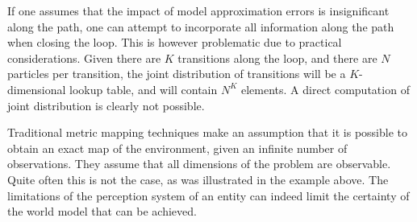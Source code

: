 If one assumes that the impact of model approximation errors is
insignificant along the path, one can attempt to incorporate all
information along the path when closing the loop. This is however
problematic due to practical considerations. Given there are $K$
transitions along the loop, and there are $N$ particles per
transition, the joint distribution of transitions will be a
$K$-dimensional lookup table, and will contain $N^K$ elements. A
direct computation of joint distribution is clearly not possible.

Traditional metric mapping techniques make an assumption that it is
possible to obtain an exact map of the environment, given an infinite
number of observations. They assume that all dimensions of the problem
are observable. Quite often this is not the case, as was illustrated in
the example above. The limitations of the perception system of an entity
can indeed limit the certainty of the world model that can be achieved.





